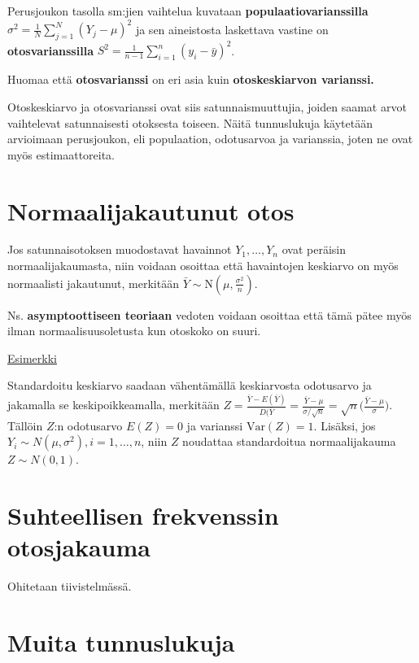 \documentclass[
]{report}
\begin{document}
Perusjoukon tasolla sm:jien vaihtelua kuvataan
\textbf{populaatiovarianssilla}
\(\sigma^2 = \frac{1}{N}\sum_{j=1}^N(Y_j - \mu)^2\) ja sen aineistosta
laskettava vastine on \textbf{otosvarianssilla}
\(S^2 = \frac{1}{n-1}\sum_{i=1}^n(y_i - \bar{y})^2\).

Huomaa että \textbf{otosvarianssi} on eri asia kuin
\textbf{otoskeskiarvon varianssi.}

Otoskeskiarvo ja otosvarianssi ovat siis satunnaismuuttujia, joiden
saamat arvot vaihtelevat satunnaisesti otoksesta toiseen. Näitä
tunnuslukuja käytetään arvioimaan perusjoukon, eli populaation,
odotusarvoa ja varianssia, joten ne ovat myös estimaattoreita.

\hypertarget{normaalijakautunut-otos}{%
\section{Normaalijakautunut otos}\label{normaalijakautunut-otos}}

Jos satunnaisotoksen muodostavat havainnot \(Y_1,\dots,Y_n\) ovat
peräisin normaalijakaumasta, niin voidaan osoittaa että havaintojen
keskiarvo on myös normaalisti jakautunut, merkitään
\(\bar{Y} \sim \text{N}(\mu, \frac{\sigma^2}{n})\).

Ns. \textbf{asymptoottiseen teoriaan} vedoten voidaan osoittaa että tämä
pätee myös ilman normaalisuusoletusta kun otoskoko on suuri.

\href{https://onlinestatbook.com/stat_sim/sampling_dist/}{Esimerkki}

Standardoitu keskiarvo saadaan vähentämällä keskiarvosta odotusarvo ja
jakamalla se keskipoikkeamalla, merkitään
\(Z = \frac{\bar{Y} - E(\bar{Y})}{D(\bar{Y}} = \frac{\bar{Y} - \mu}{\sigma/\sqrt{n}} = \sqrt{n} \Big( \frac{\bar{Y} - \mu}{\sigma} \Big)\).
Tällöin \(Z\):n odotusarvo \(E(Z)=0\) ja varianssi \(\text{Var}(Z)=1\).
Lisäksi, jos \(Y_i \sim N(\mu,\sigma^2), i=1,\dots,n\), niin \(Z\)
noudattaa standardoitua normaalijakauma \(Z \sim N(0,1)\).

\hypertarget{suhteellisen-frekvenssin-otosjakauma}{%
\section{Suhteellisen frekvenssin
otosjakauma}\label{suhteellisen-frekvenssin-otosjakauma}}

Ohitetaan tiivistelmässä.

\hypertarget{muita-tunnuslukuja}{%
\section{Muita tunnuslukuja}\label{muita-tunnuslukuja}}
\end{document}
